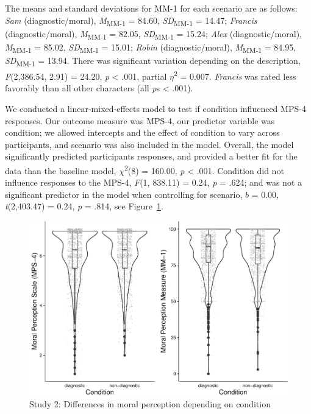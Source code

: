 \documentclass[
  english,
  man,floatsintext]{apa7}
\begin{document}
The means and standard deviations for MM-1 for each scenario are as follows:
\emph{Sam} (diagnostic/moral),
\emph{M}\textsubscript{MM-1} = 84.60, \emph{SD}\textsubscript{MM-1} = 14.47;
\emph{Francis} (diagnostic/moral),
\emph{M}\textsubscript{MM-1} = 82.05, \emph{SD}\textsubscript{MM-1} = 15.24;
\emph{Alex} (diagnostic/moral),
\emph{M}\textsubscript{MM-1} = 85.02, \emph{SD}\textsubscript{MM-1} = 15.01;
\emph{Robin} (diagnostic/moral),
\emph{M}\textsubscript{MM-1} = 84.95, \emph{SD}\textsubscript{MM-1} = 13.94. There was significant variation depending on the description, \emph{F}(2,386.54, 2.91) = 24.20, \emph{p} \textless{} .001, partial \(\eta\)\textsuperscript{2} = 0.007. \emph{Francis} was rated less favorably than all other characters (all \emph{p}s \textless{} .001).

We conducted a linear-mixed-effects model to test if condition influenced MPS-4 responses. Our outcome measure was MPS-4, our predictor variable was condition; we allowed intercepts and the effect of condition to vary across participants, and scenario was also included in the model.
Overall, the model significantly predicted participants responses, and provided a better fit for the data than the baseline model, \(\chi\)\textsuperscript{2}(8) = 160.00, \emph{p} \textless{} .001. Condition did not influence responses to the MPS-4, \emph{F}(1, 838.11) = 0.24, \emph{p} = .624; and was not a significant predictor in the model when controlling for scenario, \(b\) = 0.00, \emph{t}(2,403.47) = 0.24, \emph{p} = .814, see Figure~\ref{fig:S2bothconditionplot}.

\begin{figure}
\centering
\includegraphics{moral_dilution_in_chunks_files/figure-latex/S2bothconditionplot-1.pdf}
\caption{\label{fig:S2bothconditionplot}Study 2: Differences in moral perception depending on condition}
\end{figure}
\end{document}
